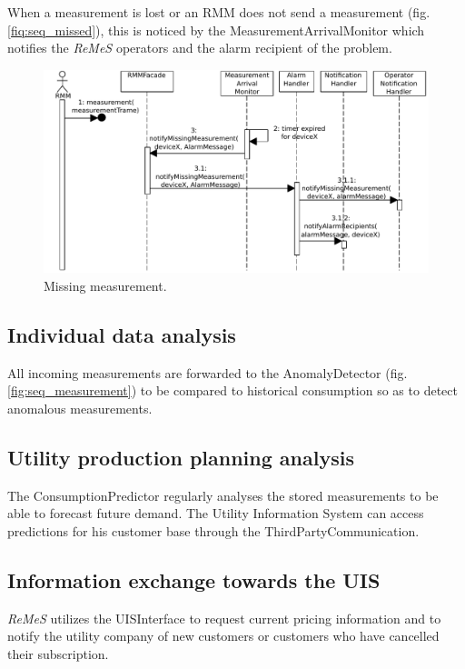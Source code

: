 \documentclass[a4paper,10pt]{article}
\newcommand{\rem}{\emph{ReMeS}\xspace}
\begin{document}
When a measurement is lost or an RMM does not send a measurement (fig. \ref{fiq:seq_missed}), this is noticed by the MeasurementArrivalMonitor which notifies the \rem operators and the alarm recipient of the problem.

\begin{figure}[!htp]
    \centering
    \includegraphics[width=\textwidth]{Missing measurement}
    \caption{Missing measurement.}
    \label{fig:seq_missed}
\end{figure}

\subsection{Individual data analysis}
All incoming measurements are forwarded to the AnomalyDetector (fig. \ref{fig:seq_measurement}) to be compared to historical consumption so as to detect anomalous measurements.

\subsection{Utility production planning analysis}
The ConsumptionPredictor regularly analyses the stored measurements to be able to forecast future demand. The Utility Information System can access predictions for his customer base through the ThirdPartyCommunication.

\subsection{Information exchange towards the UIS}
\rem utilizes the UISInterface to request current pricing information and to notify the utility company of new customers or customers who have cancelled their subscription.
\end{document}

